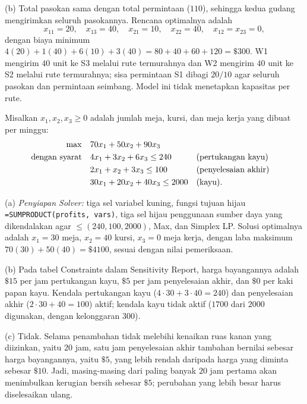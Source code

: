 (b) Total pasokan sama dengan total permintaan ($110$), sehingga kedua gudang mengirimkan seluruh pasokannya. Rencana optimalnya adalah
\[
x_{11} = 20, \quad x_{13} = 40, \quad x_{21} = 10, \quad x_{22} = 40, \quad x_{12} = x_{23} = 0,
\]
dengan biaya minimum $4(20) + 1(40) + 6(10) + 3(40) = 80 + 40 + 60 + 120 = \$300$. W1 mengirim $40$ unit ke S3 melalui rute termurahnya dan W2 mengirim $40$ unit ke S2 melalui rute termurahnya; sisa permintaan S1 dibagi $20/10$ agar seluruh pasokan dan permintaan seimbang. Model ini tidak menetapkan kapasitas per rute.


Misalkan $x_1, x_2, x_3 \geq 0$ adalah jumlah meja, kursi, dan meja kerja yang dibuat per minggu:
\begin{align*}
\max \quad & 70x_1 + 50x_2 + 90x_3\\
\mbox{dengan syarat}\quad & 4x_1 + 3x_2 + 6x_3 \leq 240 && \mbox{(pertukangan kayu)}\\
& 2x_1 + x_2 + 3x_3 \leq 100 && \mbox{(penyelesaian akhir)}\\
& 30x_1 + 20x_2 + 40x_3 \leq 2000 && \mbox{(kayu)}.
\end{align*}

(a) \emph{Penyiapan Solver:} tiga sel variabel kuning, fungsi tujuan hijau \texttt{=SUMPRODUCT(profits, vars)}, tiga sel hijau penggunaan sumber daya yang dikendalakan agar $\leq (240, 100, 2000)$, Max, dan Simplex LP. Solusi optimalnya adalah $x_1 = 30$ meja, $x_2 = 40$ kursi, $x_3 = 0$ meja kerja, dengan laba maksimum $70(30) + 50(40) = \$4100$, sesuai dengan nilai pemeriksaan.

(b) Pada tabel Constraints dalam Sensitivity Report, harga bayangannya adalah $\$15$ per jam pertukangan kayu, $\$5$ per jam penyelesaian akhir, dan $\$0$ per kaki papan kayu. Kendala pertukangan kayu ($4 \cdot 30 + 3 \cdot 40 = 240$) dan penyelesaian akhir ($2 \cdot 30 + 40 = 100$) aktif; kendala kayu tidak aktif ($1700$ dari $2000$ digunakan, dengan kelonggaran $300$).

(c) Tidak. Selama penambahan tidak melebihi kenaikan ruas kanan yang diizinkan, yaitu $20$ jam, satu jam penyelesaian akhir tambahan bernilai sebesar harga bayangannya, yaitu $\$5$, yang lebih rendah daripada harga yang diminta sebesar $\$10$. Jadi, masing-masing dari paling banyak $20$ jam pertama akan menimbulkan kerugian bersih sebesar $\$5$; perubahan yang lebih besar harus diselesaikan ulang.

